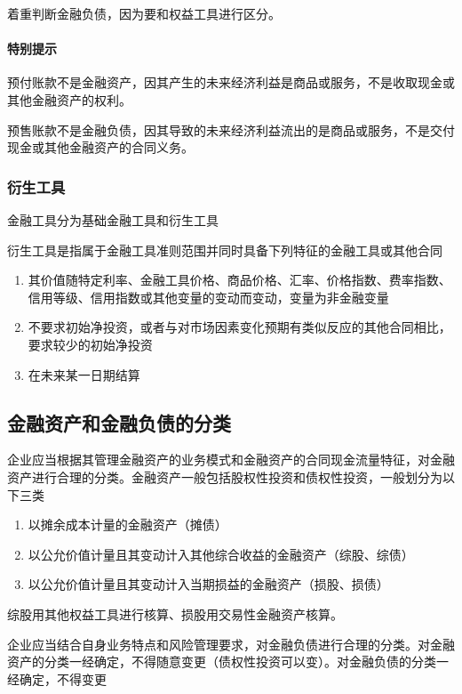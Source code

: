 \documentclass[UTF8,12pt]{ctexart}
\numberwithin{equation}{section} %
\numberwithin{figure}{section}
\numberwithin{table}{section}
\begin{document}
	着重判断金融负债，因为要和权益工具进行区分。
	
	\paragraph{特别提示}
	预付账款不是金融资产，因其产生的未来经济利益是商品或服务，不是收取现金或其他金融资产的权利。
	
	预售账款不是金融负债，因其导致的未来经济利益流出的是商品或服务，不是交付现金或其他金融资产的合同义务。
	
	
	\subsubsection{衍生工具}
	金融工具分为基础金融工具和衍生工具
	
	衍生工具是指属于金融工具准则范围并同时具备下列特征的金融工具或其他合同
	\begin{enumerate}
		\item 其价值随特定利率、金融工具价格、商品价格、汇率、价格指数、费率指数、信用等级、信用指数或其他变量的变动而变动，变量为非金融变量
		
		\item 不要求初始净投资，或者与对市场因素变化预期有类似反应的其他合同相比，要求较少的初始净投资
		
		\item 在未来某一日期结算
	\end{enumerate}
	
	\subsection{金融资产和金融负债的分类}
	企业应当根据其管理金融资产的业务模式和金融资产的合同现金流量特征，对金融资产进行合理的分类。金融资产一般包括股权性投资和债权性投资，一般划分为以下三类
	\begin{enumerate}
		\item 以摊余成本计量的金融资产（摊债）
		
		\item 以公允价值计量且其变动计入其他综合收益的金融资产（综股、综债）
		
		\item 以公允价值计量且其变动计入当期损益的金融资产（损股、损债）
	\end{enumerate}

	综股用其他权益工具进行核算、损股用交易性金融资产核算。
	
	企业应当结合自身业务特点和风险管理要求，对金融负债进行合理的分类。对金融资产的分类一经确定，不得随意变更（债权性投资可以变）。对金融负债的分类一经确定，不得变更
	
\end{document}
